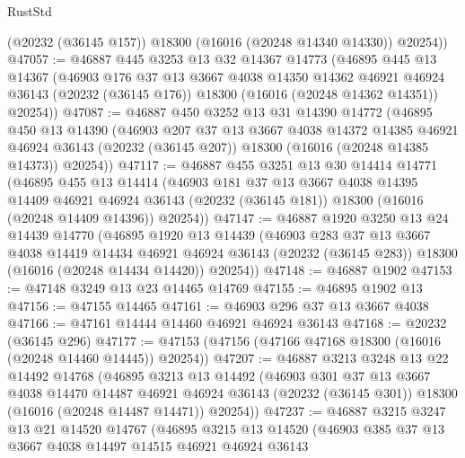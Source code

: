\begin{lexlean}{RustStd}
\begin{coremodule}
        (@20232 (@36145 @157))
        @18300
        (@16016 (@20248 @14340 @14330))
        @20254))
@47057 := @46887
    @445
    @3253
    @13
    @32
    @14367
    @14773
    (@46895
      @445
      @13
      @14367
      (@46903
        @176
        @37
        @13
        @3667
        @4038
        @14350
        @14362
        @46921
        @46924
        @36143
        (@20232 (@36145 @176))
        @18300
        (@16016 (@20248 @14362 @14351))
        @20254))
@47087 := @46887
    @450
    @3252
    @13
    @31
    @14390
    @14772
    (@46895
      @450
      @13
      @14390
      (@46903
        @207
        @37
        @13
        @3667
        @4038
        @14372
        @14385
        @46921
        @46924
        @36143
        (@20232 (@36145 @207))
        @18300
        (@16016 (@20248 @14385 @14373))
        @20254))
@47117 := @46887
    @455
    @3251
    @13
    @30
    @14414
    @14771
    (@46895
      @455
      @13
      @14414
      (@46903
        @181
        @37
        @13
        @3667
        @4038
        @14395
        @14409
        @46921
        @46924
        @36143
        (@20232 (@36145 @181))
        @18300
        (@16016 (@20248 @14409 @14396))
        @20254))
@47147 := @46887
    @1920
    @3250
    @13
    @24
    @14439
    @14770
    (@46895
      @1920
      @13
      @14439
      (@46903
        @283
        @37
        @13
        @3667
        @4038
        @14419
        @14434
        @46921
        @46924
        @36143
        (@20232 (@36145 @283))
        @18300
        (@16016 (@20248 @14434 @14420))
        @20254))
@47148 := @46887 @1902
@47153 := @47148 @3249 @13 @23 @14465 @14769
@47155 := @46895 @1902 @13
@47156 := @47155 @14465
@47161 := @46903 @296 @37 @13 @3667 @4038
@47166 := @47161 @14444 @14460 @46921 @46924 @36143
@47168 := @20232 (@36145 @296)
@47177 := @47153 (@47156 (@47166 @47168 @18300 (@16016 (@20248 @14460 @14445)) @20254))
@47207 := @46887
    @3213
    @3248
    @13
    @22
    @14492
    @14768
    (@46895
      @3213
      @13
      @14492
      (@46903
        @301
        @37
        @13
        @3667
        @4038
        @14470
        @14487
        @46921
        @46924
        @36143
        (@20232 (@36145 @301))
        @18300
        (@16016 (@20248 @14487 @14471))
        @20254))
@47237 := @46887
    @3215
    @3247
    @13
    @21
    @14520
    @14767
    (@46895
      @3215
      @13
      @14520
      (@46903
        @385
        @37
        @13
        @3667
        @4038
        @14497
        @14515
        @46921
        @46924
        @36143

\end{coremodule}
\end{lexlean}
